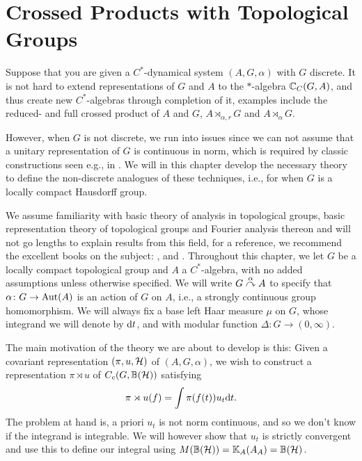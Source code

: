\chapter{Crossed Products with Topological Groups}
Suppose that you are given a $C^*$-dynamical system $(A,G,\alpha)$ with $G$ discrete. It is not hard to extend representations of $G$ and $A$ to the $*$-algebra $\mathbb{C}_C(G,A)$, and thus create new $C^*$-algebras through completion of it, examples include the reduced- and full crossed product of $A$ and $G$, $A \rtimes_{\alpha,r} G$ and $A \rtimes_{\alpha} G$.

However, when $G$ is not discrete, we run into issues since we can not assume that a unitary representation of $G$ is continuous in norm, which is required by classic constructions seen e.g., in \cite{brown2008c}. We will in this chapter develop the necessary theory to define the non-discrete analogues of these techniques, i.e., for when $G$ is a locally compact Hausdorff group.

We assume familiarity with basic theory of analysis in topological groups, basic representation theory of topological groups and Fourier analysis thereon and will not go lengths to explain results from this field, for a reference, we recommend the excellent books on the subject: \cite{folland2016fourier}, \cite{berg1984harmonic} and \cite{folland2013real}. 
Throughout this chapter, we let $G$ be a locally compact topological group and $A$ a $C^*$-algebra, with no added assumptions unless otherwise specified. We will write $G \stackrel{\alpha}{\curvearrowright} A$ to specify that $\alpha \colon G \to \operatorname{Aut}(A)$ is an action of $G$ on $A$, i.e., a strongly continuous group homomorphism. We will always fix a base left Haar measure $\mu$ on $G$, whose integrand we will denote by $\mathrm{d} t$, and with modular function $\Delta \colon G \to (0,\infty)$. 

The main motivation of the theory we are about to develop is this: Given a covariant representation $(\pi,u,\mathcal{H})$ of $(A,G,\alpha)$, we wish to construct a representation $\pi \rtimes u$ of $C_c(G,\mathbb{B}(\mathcal{H}))$ satisfying 
\begin{align*}
	\pi \rtimes u (f) = \int \pi(f(t))u_t \mathrm{d} t.
\end{align*}
The problem at hand is, a priori $u_t$ is not norm continuous, and so we don't know if the integrand is integrable. We will however show that $u_t$ is strictly convergent and use this to define our integral using $M(\mathbb{B}(\mathcal{H})) = \mathbb{K}_A(A_A)= \mathbb{B}(\mathcal{H})$. 

